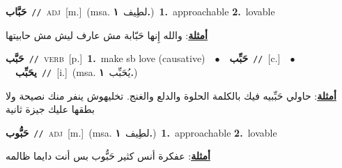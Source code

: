 \documentclass[10pt,a4paper,twoside]{article} %
\begin{document}
\begin{multicols}{2}
{\setlength\topsep{0pt}\textbf{\foreignlanguage{arabic}{حَبَّاب}}\ {\color{gray}\texttt{//}\color{black}}\ \textsc{adj}\ [m.]\ \color{gray}(msa. \foreignlanguage{arabic}{لطِيف}~\foreignlanguage{arabic}{\textbf{١.}})\color{black}\ \textbf{1.}~approachable  \textbf{2.}~lovable\  \begin{flushright}\color{gray}\foreignlanguage{arabic}{\textbf{\underline{\foreignlanguage{arabic}{أمثلة}}}: والله إِنها حَبّابة مش عارف ليش مش حابيتها}\end{flushright}\color{black}} \vspace{2mm}

{\setlength\topsep{0pt}\textbf{\foreignlanguage{arabic}{حَبَّب}}\ {\color{gray}\texttt{//}\color{black}}\ \textsc{verb}\ [p.]\ \textbf{1.}~make sb love (causative)\ \ $\bullet$\ \ \setlength\topsep{0pt}\textbf{\foreignlanguage{arabic}{حَبِّب}}\ {\color{gray}\texttt{//}\color{black}}\ [c.]\ \ $\bullet$\ \ \setlength\topsep{0pt}\textbf{\foreignlanguage{arabic}{يحَبِّب}}\ {\color{gray}\texttt{//}\color{black}}\ [i.]\ \color{gray}(msa. \foreignlanguage{arabic}{يُحَبِّب}~\foreignlanguage{arabic}{\textbf{١.}})\color{black}\  \begin{flushright}\color{gray}\foreignlanguage{arabic}{\textbf{\underline{\foreignlanguage{arabic}{أمثلة}}}: حاولي حَبِّبيه فيك بالكلمة الحلوة والدلع والغنج. تخليهوش ينفر منك نصيحة ولا بطقها عليك جيزة ثانية}\end{flushright}\color{black}} \vspace{2mm}

{\setlength\topsep{0pt}\textbf{\foreignlanguage{arabic}{حَبُّوب}}\ {\color{gray}\texttt{//}\color{black}}\ \textsc{adj}\ [m.]\ \color{gray}(msa. \foreignlanguage{arabic}{لطِيف}~\foreignlanguage{arabic}{\textbf{١.}})\color{black}\ \textbf{1.}~approachable  \textbf{2.}~lovable\  \begin{flushright}\color{gray}\foreignlanguage{arabic}{\textbf{\underline{\foreignlanguage{arabic}{أمثلة}}}: عفكرة أنس كثير حَبُّوب بس أنت دايما ظالمه}\end{flushright}\color{black}} \vspace{2mm}


\end{multicols}
\end{document}
